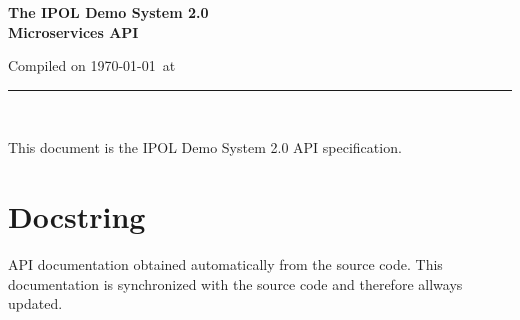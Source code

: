 \documentclass[a4paper,12pt]{article}
\begin{document}
\begin{titlepage}

\begin{center}
\vspace*{-1in}

\vspace*{0.6in}
\begin{Large}
\textbf{The IPOL Demo System 2.0 \\Microservices API} \\
\end{Large}

\vspace*{0.6in}

\small{Compiled on \today\ at \currenttime}

\vspace*{0.6in}
\rule{80mm}{0.1mm}\\
\vspace*{0.1in}
\end{center}

\end{titlepage}

This document is the IPOL Demo System 2.0 API specification.

\newpage

\tableofcontents
\newpage

\section{Docstring}
\label{sec:Docstring}
API documentation obtained automatically from the source code. This documentation is synchronized with the source code and therefore allways updated.



\end{document}
